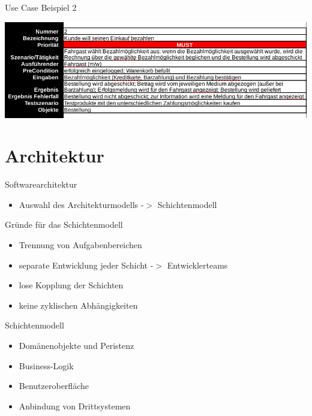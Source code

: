 \documentclass{beamer}
\begin{document}
\begin{frame}{Use Case Beispiel 2}
	\begin{center}
		\includegraphics[width=\textwidth]{img/use-case-bsp-2.png}
	\end{center}
\end{frame}

\section{Architektur}
\begin{frame}{Softwarearchitektur}
	\begin{itemize}
		\item Auswahl des Architekturmodells -$>$ Schichtenmodell
	\end{itemize}
	\begin{block}{Gründe für das Schichtenmodell}
		\begin{itemize}
			\item Trennung von Aufgabenbereichen
			\item separate Entwicklung jeder Schicht -$>$ Entwicklerteams
			\item lose Kopplung der Schichten
			\item keine zyklischen Abhängigkeiten
		\end{itemize}
	\end{block}
\end{frame}

\begin{frame}{Schichtenmodell}
	\begin{itemize}
		\item Domänenobjekte und Peristenz
		\item Business-Logik
		\item Benutzeroberfläche
		\item Anbindung von Drittsystemen
	\end{itemize}
\end{frame}
\end{document}
